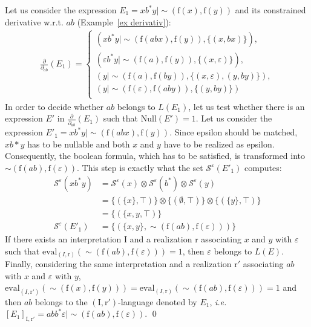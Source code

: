 \documentclass[a4paper]{llncs}
\begin{document}
  \begin{example}
    Let us consider the expression $E_1=xb^*y\mid \sim(\mathrm{f}(x),\mathrm{f}(y))$ and its constrained derivative w.r.t. $ab$ (Example~\ref{ex derivativ}):
        \begin{align*}
    \frac{\partial}{\partial_{ab}}(E_1)=
    \begin{cases}
          (xb^*y\mid \sim(\mathrm{f}(abx),\mathrm{f}(y)),\{(x,bx)\}),\\
          (\varepsilon b^*y\mid \sim(\mathrm{f}(a),\mathrm{f}(y)),\{(x,\varepsilon)\}),\\
          (y\mid \sim(\mathrm{f}(a),\mathrm{f}(by)),\{(x,\varepsilon),(y,by)\}),\\
          (y\mid \sim(\mathrm{f}(\varepsilon),\mathrm{f}(aby)),\{(y,by)\})\\
        \end{cases}
        \end{align*}      
      In order to decide whether $ab$ belongs to $L(E_1)$, let us test whether there is an expression $E'$ in $\frac{\partial}{\partial_{ab}}(E_1)$ such that $\mathrm{Null}(E')=1$.
      Let us consider the expression $E'_1=xb^*y\mid \sim(\mathrm{f}(abx),\mathrm{f}(y))$. 
Since epsilon should be matched, $xb*y$ has to be nullable and both $x$ and $y$ have to be realized as epsilon. 
      Consequently, the boolean formula, which has to be satisfied, is transformed into $\sim(\mathrm{f}(ab),\mathrm{f}(\varepsilon))$. This step is exactly what the set $\mathcal{S}^{\varepsilon}(E'_1)$ computes:
        \begin{align*}
        \mathcal{S}^{\varepsilon}(xb^*y) & =\mathcal{S}^{\varepsilon}(x)\otimes \mathcal{S}^{\varepsilon}(b^*) \otimes \mathcal{S}^{\varepsilon}(y)\\
          & =\{(\{x\},\top)\}\otimes \{(\emptyset,\top)\} \otimes \{(\{y\},\top)\}\\
          & =\{(\{x,y,\top)\}\\
          \mathcal{S}^{\varepsilon}(E'_1) & =\{(\{x,y\},\sim(\mathrm{f}(ab),\mathrm{f}(\varepsilon)))\}
        \end{align*}
        If there exists an interpretation $\mathrm{I}$ and a realization $\mathrm{r}$ associating $x$ and $y$ with $\varepsilon$ such that $\mathrm{eval}_{(I,\mathrm{r})}(\sim(\mathrm{f}(ab),\mathrm{f}(\varepsilon)))=1$, then $\varepsilon$ belongs to $L(E)$. Finally, considering the same interpretation and a realization $\mathrm{r}'$ associating $ab$ with $x$ and $\varepsilon$ with $y$, $\mathrm{eval}_{(I,\mathrm{r}')}(\sim(\mathrm{f}(x),\mathrm{f}(y)))=\mathrm{eval}_{(I,\mathrm{r})}(\sim(\mathrm{f}(ab),\mathrm{f}(\varepsilon)))=1$ and then $ab$ belongs to the $(\mathrm{I},\mathrm{r}')$-language denoted by $E_1$, \emph{i.e.} $[E_1]_{\mathrm{I},\mathrm{r}'}=abb^*\varepsilon\mid \sim(\mathrm{f}(ab),\mathrm{f}(\varepsilon))$.
      \qed
  \end{example}
  
\end{document}
